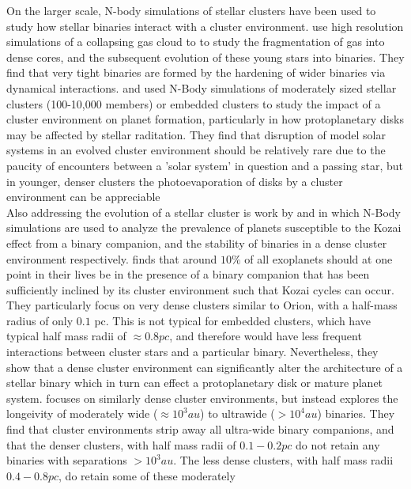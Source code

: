 \documentclass{aastex631}
\begin{document}
\indent On the larger scale, N-body simulations of stellar clusters have been used to study how stellar binaries interact with a cluster environment. \cite{bat03} 
use high resolution simulations of a collapsing gas cloud to to study the fragmentation of gas into dense cores, 
and the subsequent evolution of these young stars into binaries. They find that very
 tight binaries are formed by the hardening of wider binaries via dynamical interactions. \cite{ada06} and \cite{pro09} used N-Body simulations of moderately sized stellar clusters
  (100-10,000 members) or embedded clusters to study the impact of a cluster environment on planet formation, particularly in how protoplanetary disks may be affected by stellar raditation.
  They find that disruption of model solar systems in an evolved cluster environment \citep{ada06} should be relatively rare due to the paucity of encounters between a 'solar system' 
  in question and a passing star, but in younger, denser clusters the photoevaporation of disks by a cluster environment can be appreciable \citep{pro09}\\
  \indent Also addressing the evolution of a stellar cluster is work by \cite{par09kozai} and \cite{par09binaries} in which N-Body simulations are used to analyze the prevalence of 
  planets susceptible to the Kozai effect from a binary companion, and the stability of binaries in a dense cluster environment respectively. \cite{par09kozai} finds that 
  around $10\%$ of all exoplanets should at one point in their lives be in the presence of a binary companion that has been sufficiently inclined by its cluster environment
  such that Kozai cycles can occur. They particularly focus on very dense clusters similar to Orion, with a half-mass radius of only $0.1$ pc. This is not typical for embedded
  clusters, which have typical half mass radii of $\approx 0.8 pc$\cite{lad03}, and therefore would have less frequent interactions between cluster stars and a particular binary.
  Nevertheless, they show that a dense cluster environment can significantly alter the architecture of a stellar binary which in turn can effect a protoplanetary disk or mature
  planet system. \cite{par09binaries} focuses on similarly dense cluster environments, but instead explores the longeivity of moderately wide ($\approx 10^3 au$) 
  to ultrawide ($> 10^4 au$) binaries. They find that cluster environments strip away all ultra-wide binary companions, and that the denser clusters, with half mass radii of 
  $0.1 - 0.2 pc$ do not retain any binaries with separations $> 10^3 au$. The less dense clusters, with half mass radii $0.4 - 0.8 pc$, do retain some of these moderately
\end{document}
